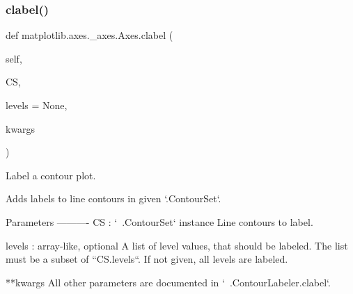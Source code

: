  \mbox{\label{classmatplotlib_1_1axes_1_1__axes_1_1Axes_ac570d5069302f260ce8ff61fae425274}} 
\subsubsection{\texorpdfstring{clabel()}{clabel()}}
{\footnotesize\ttfamily def matplotlib.\+axes.\+\_\+axes.\+Axes.\+clabel (\begin{DoxyParamCaption}\item[{}]{self,  }\item[{}]{CS,  }\item[{}]{levels = {\ttfamily None},  }\item[{}]{kwargs }\end{DoxyParamCaption})}

\begin{DoxyVerb}Label a contour plot.

Adds labels to line contours in given `.ContourSet`.

Parameters
----------
CS : `~.ContourSet` instance
    Line contours to label.

levels : array-like, optional
    A list of level values, that should be labeled. The list must be
    a subset of ``CS.levels``. If not given, all levels are labeled.

**kwargs
    All other parameters are documented in `~.ContourLabeler.clabel`.
\end{DoxyVerb}
 \mbox{\label{classmatplotlib_1_1axes_1_1__axes_1_1Axes_a2afb0255d5390cca20abbd244fe3cea5}} 
